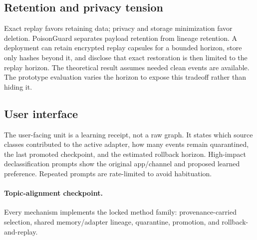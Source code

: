 \subsection{Retention and privacy tension}

Exact replay favors retaining data; privacy and storage minimization favor deletion. PoisonGuard separates payload retention from lineage retention. A deployment can retain encrypted replay capsules for a bounded horizon, store only hashes beyond it, and disclose that exact restoration is then limited to the replay horizon. The theoretical result assumes needed clean events are available. The prototype evaluation varies the horizon to expose this tradeoff rather than hiding it.

\subsection{User interface}

The user-facing unit is a learning receipt, not a raw graph. It states which source classes contributed to the active adapter, how many events remain quarantined, the last promoted checkpoint, and the estimated rollback horizon. High-impact declassification prompts show the original app/channel and proposed learned preference. Repeated prompts are rate-limited to avoid habituation.

\paragraph{Topic-alignment checkpoint.} Every mechanism implements the locked method family: provenance-carried selection, shared memory/adapter lineage, quarantine, promotion, and rollback-and-replay.

